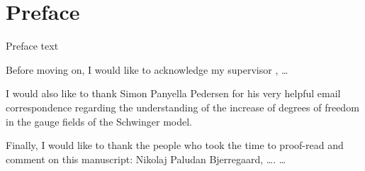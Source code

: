 \documentclass[../main.tex]{subfiles} %
\begin{document}
\chapter*{Preface}

Preface text


Before moving on, I would like to acknowledge my supervisor \Supervisor, \ldots

I would also like to thank Simon Panyella Pedersen for his very helpful email correspondence regarding the understanding of the increase of degrees of freedom in the gauge fields of the Schwinger model.

Finally, I would like to thank the people who took the time to proof-read and comment on this manuscript: Nikolaj Paludan Bjerregaard, \ldots. \ldots




\end{document}
